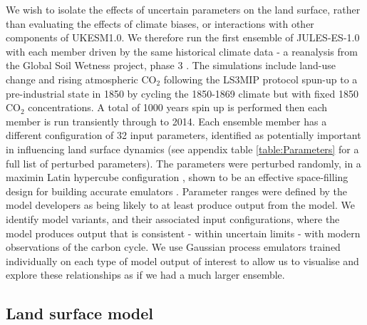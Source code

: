 \documentclass[gmd, manuscript]{copernicus}
\begin{document}
We wish to isolate the effects of uncertain parameters on the land surface, rather than evaluating the effects of climate biases, or interactions with other components of UKESM1.0. We therefore run the first ensemble of JULES-ES-1.0  with each member driven by the same historical climate data - a reanalysis from the Global Soil Wetness project, phase 3 \citep{kim2017global}. The simulations include land-use change and rising atmospheric CO$_2$ following the LS3MIP protocol \citep{gmd-9-2809-2016} spun-up to a pre-industrial state in 1850 by cycling the 1850-1869 climate but with fixed 1850 CO$_2$ concentrations. A total of 1000 years spin up is performed then each member is run transiently through to 2014. Each ensemble member has a different configuration of 32 input parameters, identified as potentially important in influencing land surface dynamics (see appendix table \ref{table:Parameters} for a full list of perturbed parameters). The parameters were perturbed randomly, in a maximin Latin hypercube configuration \citep{mckay1979comparison}, shown to be an effective space-filling design for building accurate emulators \citep{urban2010comparison}. Parameter ranges were defined by the model developers as being likely to at least produce output from the model. We identify model variants, and their associated input configurations, where the model produces output that is consistent - within uncertain limits - with modern observations of the carbon cycle. We use Gaussian process emulators trained individually on each type of model output of interest to allow us to visualise and explore these relationships as if we had a much larger ensemble.


\subsection{Land surface model}\label{ssec:land_surface_model}
\end{document}
